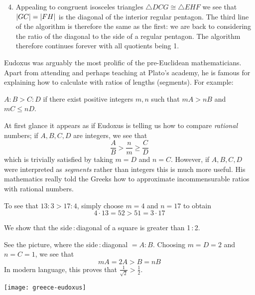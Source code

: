 	
\begin{enumerate}\setcounter{enumi}{3}
	\item Appealing to congruent isosceles triangles $\triangle DCG\cong\triangle EHF$ we see that $\left| GC\right|=\left| FH\right|$ is the diagonal of the interior regular pentagon. The third line of the algorithm is therefore the same as the first: we are back to considering the ratio of the diagonal to the side of a regular pentagon. The algorithm therefore continues forever with all quotients being 1.
\end{enumerate}
	
\goodbreak



\label{pg:eudoxus}

Eudoxus was arguably the most prolific of the pre-Euclidean mathematicians. Apart from attending and perhaps teaching at Plato's academy, he is famous for explaining how to calculate with ratios of lengths (segments). For example:

\begin{defn*}{}{}
	$A:B>C:D$ if there exist positive integers $m,n$ such that $mA>nB$ and $mC\le nD$.
\end{defn*}

At first glance it appears as if Eudoxus is telling us how to compare \emph{rational} numbers; if $A,B,C,D$ are integers, we see that
\[
	\frac AB>\frac nm\ge \frac CD
\]
which is trivially satisfied by taking $m=D$ and $n=C$. However, if $A,B,C,D$ were interpreted as \emph{segments} rather than integers this is much more useful. His mathematics really told the Greeks how to approximate incommensurable ratios with rational numbers.


\exstart To see that $13:3>17:4$, simply choose $m=4$ and $n=17$ to obtain
  \[4\cdot 13=52>51=3\cdot 17\]

\begin{enumerate}\setcounter{enumi}{1}
  \begin{minipage}[t]{0.68\linewidth}\vspace{-10pt}
    \item We show that the side\,:\,diagonal of a square is greater than 1\,:\,2.\par
    See the picture, where the side\,:\,diagonal $=A:B$. Choosing $m=D=2$ and $n=C=1$, we see that
  	\[
  		mA=2A>B=nB \tag{diag $>$ side of large square}
  	\]
  	In modern language, this proves that $\frac 1{\sqrt 2}>\frac 12$.
  \end{minipage}
  \hfill
  \begin{minipage}[t]{0.31\linewidth}\vspace{-10pt}
  	\flushright
  	\texttt{[image: greece-eudoxus]}
  \end{minipage}
\end{enumerate}


